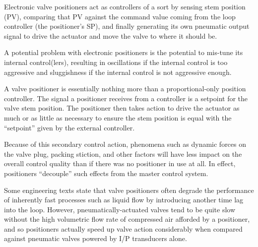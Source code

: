 





Electronic valve positioners act as controllers of a sort by sensing stem position (PV), comparing that PV against the command value coming from the loop controller (the positioner's SP), and finally generating its own pneumatic output signal to drive the actuator and move the valve to where it should be.

\vskip 10pt

A potential problem with electronic positioners is the potential to mis-tune its internal control(lers), resulting in oscillations if the internal control is too aggressive and sluggishness if the internal control is not aggressive enough.  







A valve positioner is essentially nothing more than a proportional-only position controller.  The signal a positioner receives from a controller is a setpoint for the valve stem position.  The positioner then takes action to drive the actuator as much or as little as necessary to ensure the stem position is equal with the ``setpoint'' given by the external controller.

Because of this secondary control action, phenomena such as dynamic forces on the valve plug, packing stiction, and other factors will have less impact on the overall control quality than if there was no positioner in use at all.  In effect, positioners ``decouple'' such effects from the master control system.

\vskip 10pt

Some engineering texts state that valve positioners often degrade the performance of inherently fast processes such as liquid flow by introducing another time lag into the loop.  However, pneumatically-actuated valves tend to be quite slow without the high volumetric flow rate of compressed air afforded by a positioner, and so positioners actually speed up valve action considerably when compared against pneumatic valves powered by I/P transducers alone.




